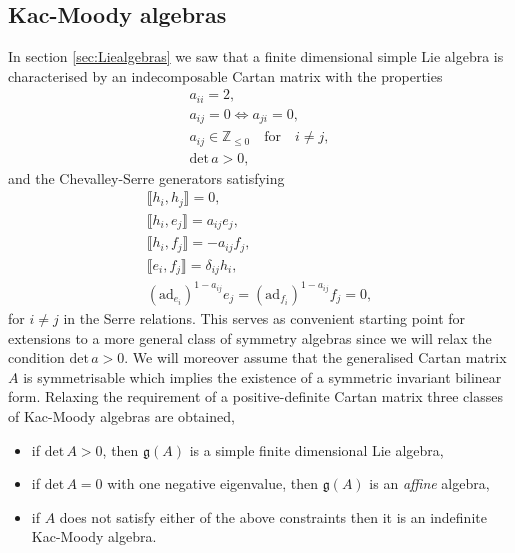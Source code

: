 \subsection{Kac-Moody algebras}\label{sec:KacMoody}
In section \ref{sec:Liealgebras} we saw that a finite dimensional simple Lie algebra is characterised by an indecomposable Cartan matrix with the properties 
\begin{equation}
    \begin{aligned}
        a_{ii} = 2,\\
        a_{ij} = 0 \Longleftrightarrow a_{ji} = 0,\\
        a_{ij}\in \mathbb{Z}_{\leq 0} \quad\text{for}\quad i\neq j,\\
        \text{det}\,a >0,
    \end{aligned}
\end{equation}
and the Chevalley-Serre generators satisfying 
\begin{equation}
\begin{aligned}\label{eq:ChevalleySerre2}
    \llbracket h_i,h_j\rrbracket = 0,\\
    \llbracket h_i,e_j\rrbracket = a_{ij}e_{j},\\
    \llbracket h_i,f_j\rrbracket = -a_{ij}f_{j},\\
    \llbracket e_i,f_j\rrbracket = \delta_{ij}h_i,\\
    (\text{ad}_{e_i})^{1-a_{ij}}e_j = (\text{ad}_{f_i})^{1-a_{ij}}f_j = 0,
\end{aligned}
\end{equation}
for $i\neq j$ in the Serre relations. This serves as convenient starting point for extensions to a more general class of symmetry algebras since we will relax the condition $\text{det}\,a>0$. We will moreover assume that the generalised Cartan matrix $A$ is symmetrisable which implies the existence of a symmetric invariant bilinear form. Relaxing the requirement of a positive-definite Cartan matrix three classes of Kac-Moody algebras are obtained,
\begin{itemize}
    \item if $\text{det}\,A >0$, then $\mathfrak{g}(A)$ is a simple finite dimensional Lie algebra,
    \item if $\text{det}\,A =0$ with one negative eigenvalue, then $\mathfrak{g}(A)$ is an \emph{affine} algebra,  
    \item if $A$ does not satisfy either of the above constraints then it is an indefinite Kac-Moody algebra.
\end{itemize}

